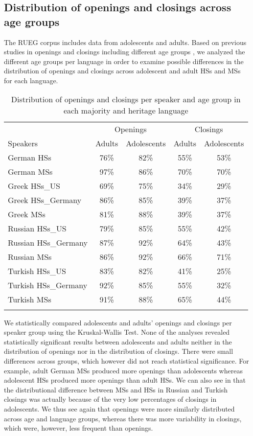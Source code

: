 \documentclass[output=paper,colorlinks,citecolor=brown]{langscibook}
\begin{document}
\subsection{Distribution of openings and closings across age groups}
The RUEG corpus includes data from adolescents and adults. Based on previous studies in openings and closings including different age groups \parencite{tolchinsky_text_2002, dollnick_entwicklung_2013}, we analyzed the different age groups per language in order to examine possible differences in the distribution of openings and closings across adolescent and adult HSs and MSs for each language. 

\begin{table}
\caption{Distribution of openings and closings per speaker and age group in each majority and heritage language}
\label{tab:katsikaetal:ageopenclose}
 \begin{tabular}{lcccc}
   \lsptoprule
            &\multicolumn{2}{c}{Openings} & \multicolumn{2}{c}{Closings}\\\cmidrule(lr){2-3}\cmidrule(lr){4-5}
    Speakers & Adults & Adolescents & Adults & Adolescents\\
    
 \midrule
  German HSs & 76\%  &   82\% & 55\% & 53\%\\
  German MSs & 97\%  &  86\% & 70\% & 70\%\\
  Greek HSs\_US & 69\%  &  75\% & 34\% & 29\%\\
  Greek HSs\_Germany & 86\%  &  85\% & 39\% & 37\%\\
  Greek MSs &  81\%  &  88\% & 39\% & 37\%\\
  Russian HSs\_US & 79\%  &  85\% & 55\% & 42\%\\
  Russian HSs\_Germany & 87\%  &  92\% & 64\% & 43\%\\
  Russian MSs &  86\%  & 92\% & 66\% & 71\%\\
  Turkish HSs\_US & 83\%  & 82\% & 41\% & 25\%\\
  Turkish HSs\_Germany & 92\%  &  85\% & 55\% & 32\%\\
  Turkish MSs &  91\%  & 88\% & 65\% & 44\%\\
  \lspbottomrule
  \end{tabular}
  \end{table}

We statistically compared adolescents and adults’ openings and closings per speaker group using the Kruskal-Wallis Test. None of the analyses revealed statistically significant results between adolescents and adults neither in the distribution of openings nor in the distribution of closings. There were small differences across groups, which however did not reach statistical significance. For example, adult German MSs produced more openings than adolescents whereas adolescent HSs produced more openings than adult HSs. We can also see in  that the distributional difference between MSs and HSs in Russian and Turkish closings was actually because of the very low percentages of closings in adolescents. We thus see again that openings were more similarly distributed across age and language groups, whereas there was more variability in closings, which were, however, less frequent than openings.  
\end{document}
